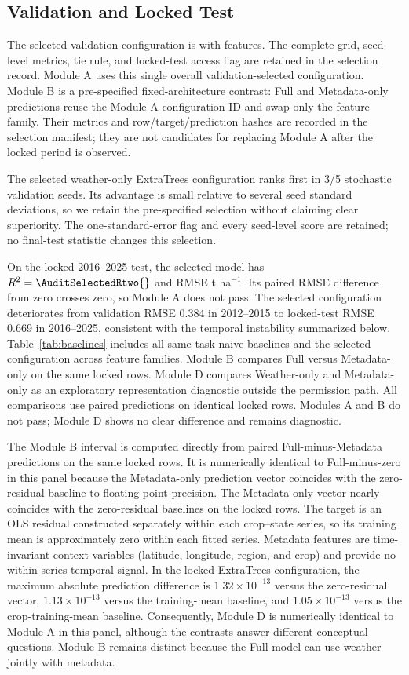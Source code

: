 \documentclass[conference]{IEEEtran}
\begin{document}
\subsection{Validation and Locked Test}
The selected validation configuration is \AuditSelectedModel{} with
\AuditSelectedFamily{} features. The complete
grid, seed-level metrics, tie rule, and locked-test access flag are retained in the
selection record. Module A uses this single overall validation-selected
configuration. Module B is a pre-specified fixed-architecture contrast: Full and
Metadata-only predictions reuse the Module A configuration ID and swap only the
feature family. Their metrics and row/target/prediction hashes are recorded in
the selection manifest; they are not candidates for replacing Module A after the
locked period is observed.

The selected weather-only ExtraTrees configuration ranks first in 3/5 stochastic
validation seeds. Its advantage is small relative to several seed standard
deviations, so we retain the pre-specified selection without claiming clear
superiority. The one-standard-error flag and every seed-level
score are retained; no final-test statistic changes this selection.

On the locked 2016--2025 test, the selected model has
$R^2=\AuditSelectedRtwo{}$ and RMSE
\AuditSelectedRMSE{} t ha$^{-1}$. Its paired RMSE difference from zero crosses
zero, so Module A does not pass. The selected configuration deteriorates from validation
RMSE 0.384 in 2012--2015 to locked-test RMSE 0.669 in 2016--2025, consistent with
the temporal instability summarized below. Table~\ref{tab:baselines} includes all
same-task naive baselines and the selected configuration across feature families.
Module B compares Full versus Metadata-only on the same locked rows. Module D
compares Weather-only and Metadata-only as an exploratory representation
diagnostic outside the permission path. All comparisons use paired predictions on
identical locked rows. Modules A and B do not pass; Module D shows no clear difference
and remains diagnostic.

The Module B interval is computed directly from paired Full-minus-Metadata
predictions on the same locked rows. It is numerically identical to
Full-minus-zero in this panel because the Metadata-only prediction vector
coincides with the zero-residual baseline to floating-point precision.
The Metadata-only vector nearly coincides with the zero-residual baselines on the
locked rows. The target is an OLS residual constructed separately within each
crop--state series, so its training mean is approximately zero within each fitted
series. Metadata features are time-invariant context variables (latitude,
longitude, region, and crop) and provide no within-series temporal signal. In the
locked ExtraTrees configuration, the maximum absolute prediction difference is
$1.32\times10^{-13}$ versus the zero-residual vector, $1.13\times10^{-13}$ versus
the training-mean baseline, and $1.05\times10^{-13}$ versus the crop-training-mean
baseline. Consequently, Module D is numerically identical to Module A in this panel,
although the contrasts answer different conceptual questions. Module B remains
distinct because the Full model can use weather jointly with metadata.
\end{document}
